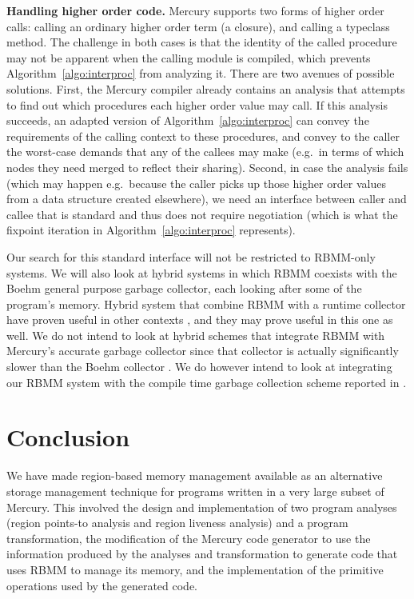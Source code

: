 \documentclass{tlp}
\begin{document}
\noindent\textbf{Handling higher order code.}
Mercury supports two forms of higher order calls:
calling an ordinary higher order term (a closure),
and calling a typeclass method.
The challenge in both cases is that
the identity of the called procedure
may not be apparent when the calling module is compiled,
which prevents Algorithm~\ref{algo:interproc} from analyzing it.
There are two avenues of possible solutions.
First, the Mercury compiler already contains an analysis
that attempts to find out which procedures each higher order value may call.
If this analysis succeeds, an adapted version of Algorithm~\ref{algo:interproc}
can convey the requirements of the calling context to these procedures,
and convey to the caller
the worst-case demands that any of the callees may make
(e.g.\ in terms of which nodes they need merged to reflect their sharing).
Second, in case the analysis fails
(which may happen e.g.\ because
the caller picks up those higher order values
from a data structure created elsewhere),
we need an interface between caller and callee
that is standard and thus does not require negotiation
(which is what the fixpoint iteration
in Algorithm~\ref{algo:interproc} represents).

Our search for this standard interface
will not be restricted to RBMM-only systems.
We will also look at hybrid systems
in which RBMM coexists with the Boehm general purpose garbage collector,
each looking after some of the program's memory.
Hybrid system that combine RBMM with a runtime collector
have proven useful in other contexts \cite{Hallenberg02},
and they may prove useful in this one as well.
We do not intend to look at hybrid schemes that integrate RBMM
with Mercury's accurate garbage collector
since that collector is actually significantly slower than the Boehm collector
\cite{Fergus02gc}.
We do however intend to look at integrating our RBMM system
with the compile time garbage collection scheme
reported in \cite{Mazur00,Mazur01,Mazur04phd}.

\section{Conclusion}
\label{seCconclusion}

We have made region-based memory management available
as an alternative storage management technique
for programs written in a very large subset of Mercury.
This involved the design and implementation of two program analyses
(region points-to analysis and region liveness analysis)
and a program transformation,
the modification of the Mercury code generator
to use the information produced by the analyses and transformation
to generate code that uses RBMM to manage its memory,
and the implementation of the primitive operations used by the generated code.
\end{document}
